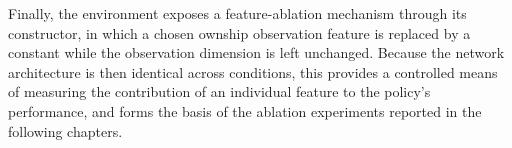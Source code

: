 Finally, the environment exposes a feature-ablation mechanism through its constructor, in which a chosen ownship observation feature is replaced by a constant while the observation dimension is left unchanged. Because the network architecture is then identical across conditions, this provides a controlled means of measuring the contribution of an individual feature to the policy's performance, and forms the basis of the ablation experiments reported in the following chapters.

\printbibliography


